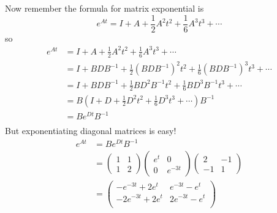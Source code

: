 \documentclass[11pt]{article}
\begin{document}
Now remember the formula for matrix exponential is
\[e^{At} = I  + A + \frac{1}{2} A^2 t^2 + \frac{1}{6} A^3 t^3 + \cdots\]
so
\begin{align*}
e^{At} &= I  + A + \frac{1}{2} A^2 t^2 + \frac{1}{6} A^3 t^3 + \cdots \\
&= I  + BDB^{-1} + \frac{1}{2} (BDB^{-1})^2 t^2 + \frac{1}{6} (BDB^{-1})^3 t^3 + \cdots\\
&= I  + BDB^{-1} + \frac{1}{2} BD^2B^{-1} t^2 + \frac{1}{6} BD^3B^{-1} t^3 + \cdots\\
&=  B \left(I + D + \frac{1}{2} D^2 t^2 + \frac{1}{6} D^3 t^3 + \cdots \right) B^{-1}\\
&=  B e^{Dt} B^{-1}\\
\end{align*}
But exponentiating diagonal matrices is easy!
\begin{align*}
e^{At} &= B e^{Dt} B^{-1} \\
&=    \left( \begin{array}{cc} 1 & 1 \\ 1 & 2 \end{array} \right)   \left( \begin{array}{cc} e^t & 0 \\ 0 & e^{-3t} \end{array} \right) \left( \begin{array}{cc} 2 & -1 \\ -1  & 1 \end{array} \right)\\
&= \left(
\begin{array}{cc}
 -e^{-3 t}+2 e^t & e^{-3 t}-e^t \\
 -2 e^{-3 t}+2 e^t & 2 e^{-3 t}-e^t \\
\end{array}
\right)
\end{align*}
 
\end{document}
